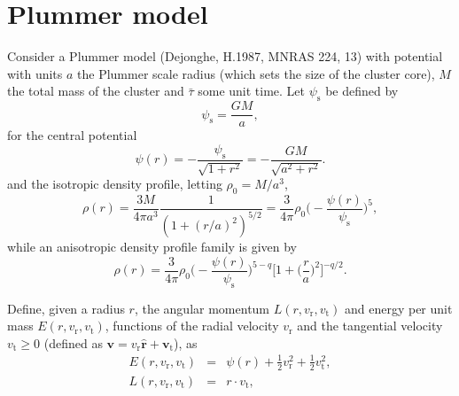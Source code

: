 \documentclass[11pt]{article}
\newcommand{\rs}{\mathrm{s}}
\newcommand{\rt}{\mathrm{t}}
\newcommand{\rr}{\mathrm{r}}
\newcommand{\psis}{\psi_{\rs}}
\newcommand{\vr}{v_{\rr}}
\newcommand{\vt}{v_{\rt}}
\newcommand{\bv}{\boldsymbol{v}}
\newcommand{\bvt}{\boldsymbol{v}_{\mathrm{t}}}
\newcommand{\br}{\boldsymbol{r}}
\newcommand{\hr}{\hat{\br}}
\begin{document}
\section{Plummer model}
\label{sec:Plummer}

  Consider a Plummer model (Dejonghe, H.1987, MNRAS 224, 13) with potential
with units $a$ the Plummer scale radius (which sets the size
of the cluster core), $M$ the total mass of the cluster and $\bar{\tau}$
some unit time. Let $\psis$ be defined by
\begin{equation}
\psis = \frac{G M}{a} ,
\label{eq:def_psi_s}
\end{equation}
for the central potential
\begin{equation}
\psi(r)=-\frac{\psis}{\sqrt{1+r^{2}}}=-\frac{GM}{\sqrt{a^{2}+r^{2}}} .
\label{eq:def_potential_Plummer}
\end{equation}
and the isotropic density profile, letting $\rho_{0}=M/a^{3}$,
\begin{equation}
\rho(r)=\frac{3M}{4\pi a^{3}}\frac{1}{(1+(r/a)^{2})^{5/2}} =\frac{3}{4\pi} \rho_{0}\bigg(-\frac{\psi(r)}{\psis}\bigg)^{5},
\label{eq:def_density_iso_Plummer}
\end{equation}
while an anisotropic density profile family is given by
\begin{equation}
\rho(r)=\frac{3}{4\pi} \rho_{0}\bigg(-\frac{\psi(r)}{\psis}\bigg)^{5-q} \bigg[1+\bigg(\frac{r}{a}\bigg)^{2}\bigg]^{-q/2}.
\label{eq:def_density_aniso_Plummer}
\end{equation}



Define, given a radius $r$, the angular momentum $L(r,\vr,\vt)$
and energy per unit mass $E(r,\vr,\vt)$, functions of
the radial velocity $\vr$ and the tangential velocity $\vt\geq 0$
(defined as $\bv=\vr \hr + \bvt$),
as
\begin{equation}
\begin{array}{ccl}
E(r,\vr,\vt) & = & \psi(r)+\frac{1}{2} \vr^{2}+\frac{1}{2}\vt^{2} ,\\
L(r,\vr,\vt) & = & r \cdot \vt ,
\end{array}
\label{eq:v_to_E_L}
\end{equation}
\end{document}
